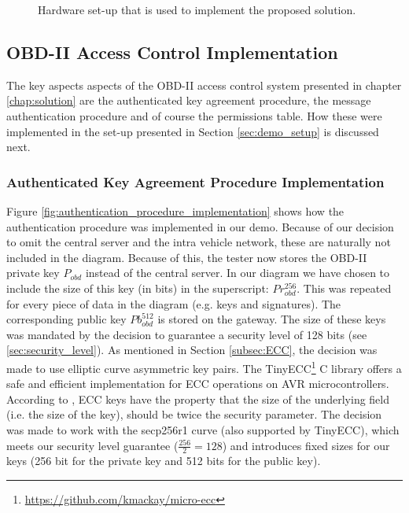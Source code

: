 \begin{figure}[h]
	\label{fig:demo}
	\caption{Hardware set-up that is used to implement the proposed solution.}
\end{figure}

\subsection{OBD-II Access Control Implementation}
The key aspects aspects of the OBD-II access control system presented in chapter \ref{chap:solution} are the authenticated key agreement procedure, the message authentication procedure and of course the permissions table. How these were implemented in the set-up presented in Section \ref{sec:demo_setup} is discussed next. 

\subsubsection{Authenticated Key Agreement Procedure Implementation}
\label{subsec:authenticated_key_agreement_procedure_implementation}

Figure \ref{fig:authentication_procedure_implementation} shows how the authentication procedure was implemented in our demo. Because of our decision to omit the central server and the intra vehicle network, these are naturally not included in the diagram. Because of this, the tester now stores the OBD-II private key $P_{obd}$ instead of the central server. In our diagram we have chosen to include the size of this key (in bits) in the superscript: $Pr_{obd}^{256}$. This was repeated for every piece of data in the diagram (e.g. keys and signatures). The corresponding public key $Pb_{obd}^{512}$ is stored on the gateway. The size of these keys was mandated by the decision to guarantee a security level of 128 bits (see \ref{sec:security_level}). As mentioned in Section \ref{subsec:ECC}, the decision was made to use elliptic curve asymmetric key pairs. The TinyECC\footnote{\url{https://github.com/kmackay/micro-ecc}} C library offers a safe and efficient implementation for ECC operations on AVR microcontrollers. According to \cite{Siddiqui}, ECC keys have the property that the size of the underlying field (i.e. the size of the key), should be twice the security parameter. The decision was made to work with the secp256r1 curve (also supported by TinyECC), which meets our security level guarantee ($\frac{256}{2}=128$) and introduces fixed sizes for our keys (256 bit for the private key and 512 bits for the public key).

